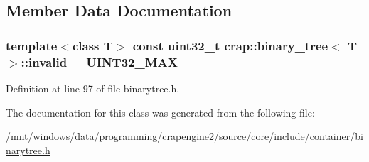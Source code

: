\subsection{Member Data Documentation}
\hypertarget{classcrap_1_1binary__tree_a87521e484b4d0bce9b166eeb635ec085}{
\subsubsection[{invalid}]{\setlength{\rightskip}{0pt plus 5cm}template$<$class T$>$ const uint32\+\_\+t {\bf crap\+::binary\+\_\+tree}$<$ T $>$\+::invalid = {\bf U\+I\+N\+T32\+\_\+\+M\+A\+X}\hspace{0.3cm}{\ttfamily [static]}}}\label{classcrap_1_1binary__tree_a87521e484b4d0bce9b166eeb635ec085}


Definition at line 97 of file binarytree.\+h.



The documentation for this class was generated from the following file\+:\begin{DoxyCompactItemize}
\item 
/mnt/windows/data/programming/crapengine2/source/core/include/container/\hyperlink{binarytree_8h}{binarytree.\+h}\end{DoxyCompactItemize}
